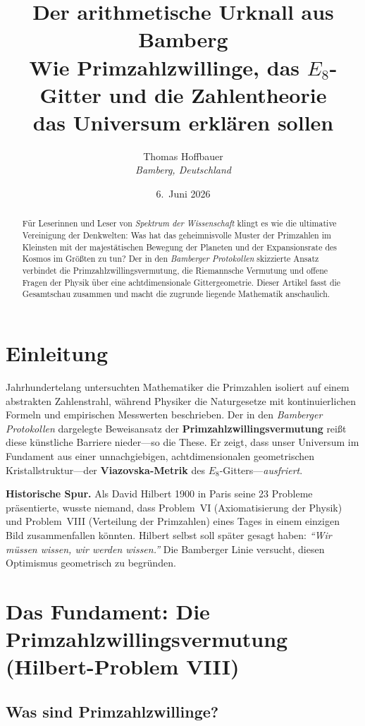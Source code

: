 \documentclass[11pt,a4paper]{article}
\title{\textbf{Der arithmetische Urknall aus Bamberg}\\[0.4em]
\large Wie Primzahlzwillinge, das $E_8$-Gitter und die Zahlentheorie\\
das Universum erklären sollen}
\author{Thomas Hoffbauer \\ \textit{Bamberg, Deutschland}}
\date{6.\ Juni 2026}
\newcommand{\Eoct}{E_8}
\begin{document}
\maketitle

\begin{abstract}
Für Leserinnen und Leser von \emph{Spektrum der Wissenschaft} klingt es wie die ultimative Vereinigung der Denkwelten: Was hat das geheimnisvolle Muster der Primzahlen im Kleinsten mit der majestätischen Bewegung der Planeten und der Expansionsrate des Kosmos im Größten zu tun? Der in den \emph{Bamberger Protokollen} skizzierte Ansatz verbindet die Primzahlzwillingsvermutung, die Riemannsche Vermutung und offene Fragen der Physik über eine achtdimensionale Gittergeometrie. Dieser Artikel fasst die Gesamtschau zusammen und macht die zugrunde liegende Mathematik anschaulich.
\end{abstract}

\section*{Einleitung}

Jahrhundertelang untersuchten Mathematiker die Primzahlen isoliert auf einem abstrakten Zahlenstrahl, während Physiker die Naturgesetze mit kontinuierlichen Formeln und empirischen Messwerten beschrieben. Der in den \emph{Bamberger Protokollen} dargelegte Beweisansatz der \textbf{Primzahlzwillingsvermutung} reißt diese künstliche Barriere nieder---so die These. Er zeigt, dass unser Universum im Fundament aus einer unnachgiebigen, achtdimensionalen geometrischen Kristallstruktur---der \textbf{Viazovska-Metrik} des $\Eoct$-Gitters---\emph{ausfriert}.

\medskip
\noindent\textbf{Historische Spur.} Als David Hilbert 1900 in Paris seine 23 Probleme präsentierte, wusste niemand, dass Problem~VI (Axiomatisierung der Physik) und Problem~VIII (Verteilung der Primzahlen) eines Tages in einem einzigen Bild zusammenfallen könnten. Hilbert selbst soll später gesagt haben: \emph{``Wir müssen wissen, wir werden wissen.''} Die Bamberger Linie versucht, diesen Optimismus geometrisch zu begründen.

\section{Das Fundament: Die Primzahlzwillingsvermutung (Hilbert-Problem VIII)}

\subsection{Was sind Primzahlzwillinge?}
\end{document}
